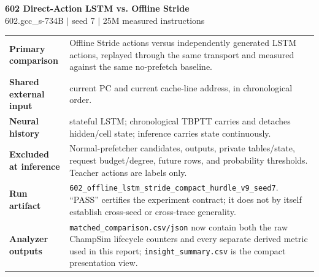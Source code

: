 \documentclass[10pt]{article}
\begin{document}
\begin{center}
{\LARGE\bfseries\color{navy} 602 Direct-Action LSTM vs. Offline Stride}\\[2pt]
{\small 602.gcc\_s-734B \quad $\vert$ \quad seed 7 \quad $\vert$ \quad 25M measured instructions}\\[4pt]
\quad
{}
\end{center}

\begin{infobox}
\begin{tabularx}{\textwidth}{@{}>{\bfseries}lX@{}}
Primary comparison & Offline Stride actions versus independently generated LSTM actions, replayed through the same transport and measured against the same no-prefetch baseline.\\
Shared external input & current PC and current cache-line address, in chronological order.\\
Neural history & stateful LSTM; chronological TBPTT carries and detaches hidden/cell state; inference carries state continuously.\\
Excluded at inference & Normal-prefetcher candidates, outputs, private tables/state, request budget/degree, future rows, and probability thresholds.  Teacher actions are labels only.\\
Run artifact & \texttt{602\_offline\_lstm\_stride\_compact\_hurdle\_v9\_seed7}.  ``PASS'' certifies the experiment contract; it does not by itself establish cross-seed or cross-trace generality.\\
Analyzer outputs & \texttt{matched\_comparison.csv/json} now contain both the
raw ChampSim lifecycle counters and every separate derived metric used in this
report; \texttt{insight\_summary.csv} is the compact presentation view.\\
\end{tabularx}
\end{infobox}
\end{document}
